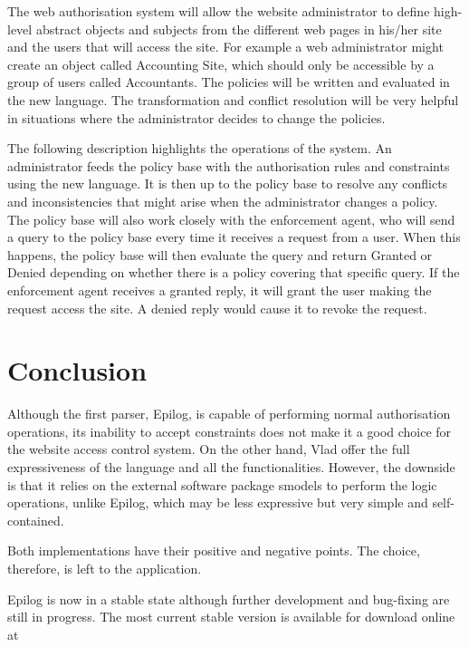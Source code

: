 \documentclass[a4paper]{article}
\begin{document}
      The web authorisation system will allow the website administrator to
      define high-level abstract objects and subjects from the different web
      pages in his/her site and the users that will access the site. For
      example a web administrator might create an object called Accounting
      Site, which should only be accessible by a group of users called
      Accountants. The policies will be written and evaluated in the new
      language. The transformation and conflict resolution will be very
      helpful in situations where the administrator decides to change
      the policies.

      The following description highlights the operations of the system. 
      An administrator feeds the policy base with the authorisation rules
      and constraints using the new language. It is then up to the policy
      base to resolve any conflicts and inconsistencies that might arise
      when the administrator changes a policy. The policy base will also
      work closely with the enforcement agent, who will send a query to
      the policy base every time it receives a request from a user. When
      this happens, the policy base will then evaluate the query and return
      Granted or Denied depending on whether there is a policy covering
      that specific query. If the enforcement agent receives a granted 
      reply, it will grant the user making the request access the site.
      A denied reply would cause it to revoke the request.

  \section{Conclusion}

    Although the first parser, Epilog, is capable of performing normal 
    authorisation operations, its inability to accept constraints does not
    make it a good choice for the website access control system. On the
    other hand, Vlad offer the full expressiveness of the language and all
    the functionalities. However, the downside is that it relies on the
    external software package smodels to perform the logic operations, unlike
    Epilog, which may be less expressive but very simple and self-contained.

    Both implementations have their positive and negative points. The choice,
    therefore, is left to the application.

    Epilog is now in a stable state although further development and
    bug-fixing are still in progress. The most current stable version 
    is available for download online at
\end{document}
